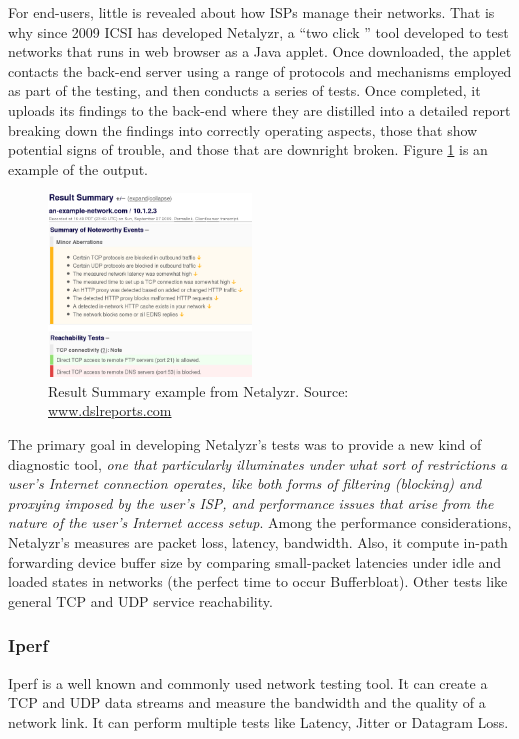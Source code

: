For end-users, little is revealed about how ISPs manage their networks. That is
why since 2009 ICSI has developed Netalyzr, a ``two click '' tool developed to
test networks that runs in web browser as a Java applet. Once downloaded, the
applet contacts the back-end server using a range of protocols and mechanisms
employed as part of the testing, and then conducts a series of tests. Once
completed, it uploads its findings to the back-end where they are distilled
into a detailed report breaking down the findings into correctly operating
aspects, those that show potential signs of trouble, and those that are
downright broken. Figure \ref{netalyzr_ex} is an example of the output.

\begin{figure}
	\begin{center}
		\includegraphics[width=0.48\textwidth]{img/netalyzr_ex}
	\end{center}
	\caption{Result Summary example from Netalyzr. Source:
	\url{www.dslreports.com}}   
	\label{netalyzr_ex} 
\end{figure}

The primary goal in developing Netalyzr's tests was to provide a new kind of
diagnostic tool, \textit{one that particularly illuminates under what sort of
restrictions a user's Internet connection operates, like both forms of filtering
(blocking) and proxying imposed by the user's ISP, and performance issues that
arise from the nature of the user's Internet access setup}\cite{netalyzr}. Among
the performance considerations, Netalyzr's measures are packet loss, latency,
bandwidth. Also, it compute in-path forwarding device buffer size by comparing
small-packet latencies under idle and loaded states in networks (the perfect
time to occur Bufferbloat). Other tests like general TCP and UDP service
reachability.

\subsubsection{Iperf}
Iperf is a well known and commonly used network testing tool. It can create a
TCP and UDP data streams and measure the bandwidth and the quality of a network
link. It can perform multiple tests like Latency, Jitter or Datagram Loss.

